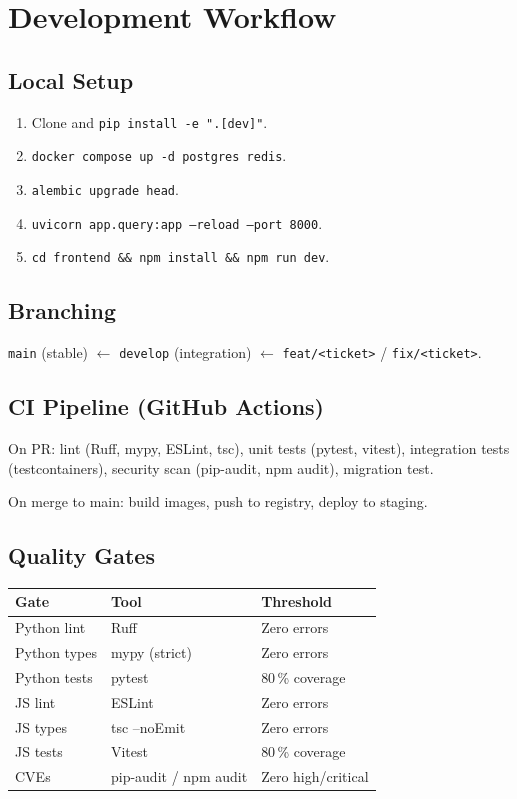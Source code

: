 \chapter{Development Workflow}

\section{Local Setup}
\begin{enumerate}
  \item Clone and \texttt{pip install -e ".[dev]"}.
  \item \texttt{docker compose up -d postgres redis}.
  \item \texttt{alembic upgrade head}.
  \item \texttt{uvicorn app.query:app --reload --port 8000}.
  \item \texttt{cd frontend \&\& npm install \&\& npm run dev}.
\end{enumerate}

\section{Branching}
\texttt{main} (stable) $\leftarrow$ \texttt{develop} (integration)
$\leftarrow$ \texttt{feat/<ticket>} / \texttt{fix/<ticket>}.

\section{CI Pipeline (GitHub Actions)}
On PR: lint (Ruff, mypy, ESLint, tsc), unit tests (pytest, vitest),
integration tests (testcontainers), security scan (pip-audit, npm audit),
migration test.

On merge to main: build images, push to registry, deploy to staging.

\section{Quality Gates}

\begin{table}[h]
\centering
\begin{tabular}{@{}lll@{}}
\toprule
\textbf{Gate} & \textbf{Tool} & \textbf{Threshold} \\
\midrule
Python lint  & Ruff          & Zero errors \\
Python types & mypy (strict) & Zero errors \\
Python tests & pytest        & 80\,\% coverage \\
JS lint      & ESLint        & Zero errors \\
JS types     & tsc --noEmit  & Zero errors \\
JS tests     & Vitest        & 80\,\% coverage \\
CVEs         & pip-audit / npm audit & Zero high/critical \\
\bottomrule
\end{tabular}
\end{table}
